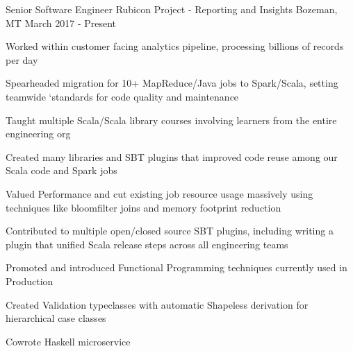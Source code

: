 

\begin{cventries}

  \cventry
    {Senior Software Engineer} %
    {Rubicon Project - Reporting and Insights} %
    {Bozeman, MT} %
    {March 2017 - Present} %
    {
      \begin{cvitems} %
        \item{Worked within customer facing analytics pipeline, processing billions of records per day}
        \item{Spearheaded migration for 10+ MapReduce/Java jobs to Spark/Scala, setting teamwide `standards for code quality and maintenance}
        \item{Taught multiple Scala/Scala library courses involving learners from the entire engineering org}
        \item{Created many libraries and SBT plugins that improved code reuse among our Scala code and Spark jobs}
        \item{Valued Performance and cut existing job resource usage massively using techniques like bloomfilter joins and memory footprint reduction}
        \item{Contributed to multiple open/closed source SBT plugins, including writing a plugin that unified Scala release steps across all engineering teams}
        \item{Promoted and introduced Functional Programming techniques currently used in Production}
        \item{Created Validation typeclasses with automatic Shapeless derivation for hierarchical case classes}
        \item{Cowrote Haskell microservice}
      \end{cvitems}
    }



\end{cventries}
